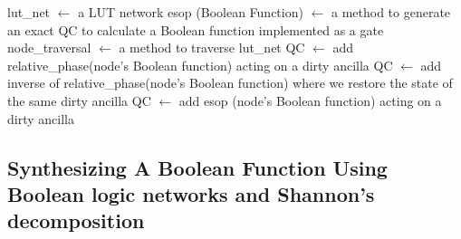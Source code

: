   

\begin{algorithm}[tb]
  \caption{lut\_synthesis}
  \label{algo-lut}
  \begin{algorithmic}
    \State lut\_net $\leftarrow$ a LUT network
    \State esop (Boolean Function) $\leftarrow$ a method to generate
    an exact QC to calculate a Boolean function implemented as a  gate 
    \State node\_traversal $\leftarrow$ a method to traverse lut\_net
    \State QC $\leftarrow$ add relative\_phase(node's Boolean function) acting on a dirty ancilla
    \State QC $\leftarrow$ add inverse of relative\_phase(node's 
    Boolean function) where we restore the state of the same dirty ancilla
    \State QC $\leftarrow$ add esop (node's Boolean function) acting on a dirty ancilla
    \EndIf
    \EndWhile
  \end{algorithmic}
\end{algorithm}

\subsection{Synthesizing A Boolean Function Using Boolean logic networks and Shannon's decomposition}

